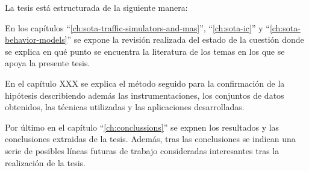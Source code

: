 La tesis está estructurada de la siguiente manera:

En los capítulos \enquote{\ref{ch:sota-traffic-simulators-and-mas}}, \enquote{\ref{ch:sota-ic}} y \enquote{\ref{ch:sota-behavior-models}} se expone la revisión realizada del estado de la cuestión donde se explica en qué punto se encuentra la literatura de los temas en los que se apoya la presente tesis.

En el capítulo XXX se explica el método seguido para la confirmación de la hipótesis describiendo además las instrumentaciones, los conjuntos de datos obtenidos, las técnicas utilizadas y las aplicaciones desarrolladas.

Por último en el capítulo \enquote{\ref{ch:conclussions}} se expnen los resultados y las conclusiones extraidas de la tesis. Además, tras las conclusiones se indican una serie de posibles líneas futuras de trabajo consideradas interesantes tras la realización de la tesis.
